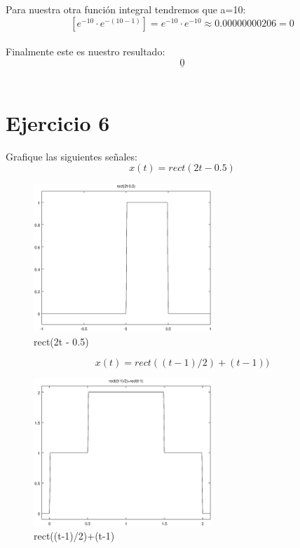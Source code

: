 \documentclass[10pt,a4paper]{report}
\begin{document}
Para nuestra otra función integral tendremos que a=10:
\[
\left [ e^{-10}\cdot e^{-(10-1)} \right ]=e^{-10}\cdot e^{-10}\approx 0.00000000206= 0
\]\\
Finalmente este es nuestro resultado:
\[
\underline{0}
\]\\







\section{Ejercicio 6}
Grafique las siguientes señales:
\begin{equation*}
x(t)=rect(2t-0.5)
\end{equation*}

\begin{figure}[H]
\centering
\includegraphics[width=0.6\textwidth]{rectA}
\caption{rect(2t - 0.5)}
\label{fig:rectA}
\end{figure}

\begin{equation*}
x(t)=rect((t-1)/2)+(t-1))
\end{equation*}

\begin{figure}[H]
\centering
\includegraphics[width=0.6\textwidth]{rectB}
\caption{rect((t-1)/2)+(t-1)}
\label{fig:rectB}
\end{figure}
\end{document}
